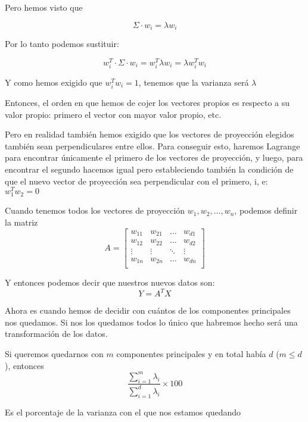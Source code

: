 \documentclass[a4paper,10pt]{article}
\begin{document}
Pero hemos visto que

\begin{equation*}
  \Sigma \cdot w_i = \lambda w_i
\end{equation*}

Por lo tanto podemos sustituir:

\begin{equation*}
  w_i^T \cdot \Sigma \cdot w_i = w_i^T \lambda w_i = \lambda w_i^Tw_i
\end{equation*}

Y como hemos exigido que $w_i^Tw_i = 1$, tenemos que la varianza será $\lambda$

Entonces, el orden en que hemos de cojer los vectores propios es respecto a su valor propio: primero el vector con mayor valor propio, etc.

Pero en realidad también hemos exigido que los vectores de proyección elegidos también sean perpendiculares entre ellos. Para conseguir esto, haremos Lagrange para encontrar únicamente el primero de los vectores de proyección, y luego, para encontrar el segundo hacemos igual pero estableciendo también la condición de que el nuevo vector de proyección sea perpendicular con el primero, i, e: $w_1^Tw_2 = 0$

Cuando tenemos todos los vectores de proyección $w_1,w_2,\dots,w_n$, podemos definir la matriz
\begin{equation*}
  A =
  \begin{bmatrix}
    w_{11} & w_{21} & \dots & w_{d1} \\
    w_{12} & w_{22} & \dots & w_{d2} \\
    \vdots & \vdots & \ddots & \vdots \\
    w_{1n} & w_{2n} & \dots & w_{dn} \\
  \end{bmatrix}
\end{equation*}

Y entonces podemos decir que nuestros nuevos datos son:
\begin{equation*}
  Y = A^TX
\end{equation*}

Ahora es cuando hemos de decidir con cuántos de los componentes principales nos quedamos. Si nos los quedamos todos lo único que habremos hecho será una transformación de los datos.

Si queremos quedarnos con $m$ componentes principales y en total había $d$ ($m \leq d$), entonces
\begin{equation*}
  \frac
  {
    \sum_{i = 1}^{m} \lambda_i
  }
  {
    \sum_{i = 1}^{d} \lambda_i
  }
  \times 100
\end{equation*}

Es el porcentaje de la varianza con el que nos estamos quedando
\end{document}
